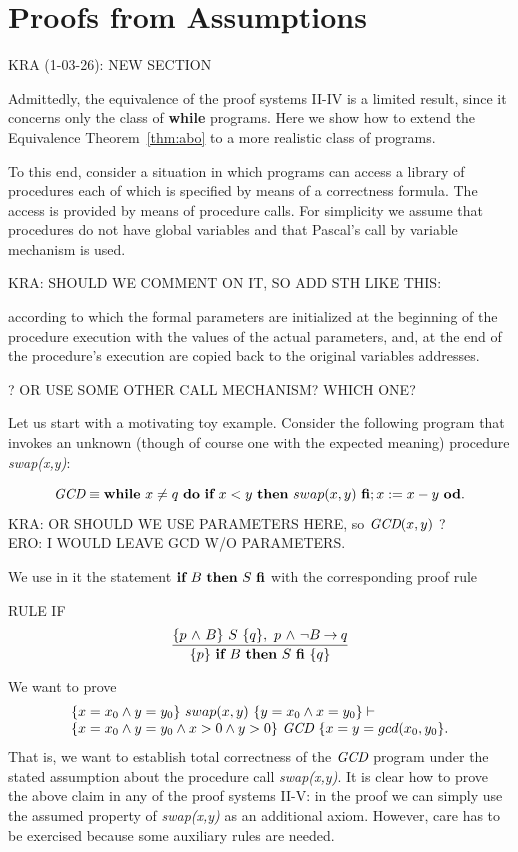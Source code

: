 \documentclass[runningheads]{llncs}       %
\begin{document}
\section{Proofs from Assumptions}

KRA (1-03-26): NEW SECTION
\III

Admittedly, the equivalence of the proof systems II-IV is a limited
result, since it concerns only the class of \textbf{while}
programs. Here we show how to extend the Equivalence
Theorem~\ref{thm:abo} to a more realistic class of programs.

To this end, consider a situation in which programs can access a library of
procedures each of which is specified by means of a correctness
formula. The access is provided by means of procedure calls.  For
simplicity we assume that procedures do not have global variables and
that Pascal's call by variable mechanism is used.

KRA: SHOULD WE COMMENT ON IT, SO ADD STH LIKE THIS: 

\NI
according to which the formal parameters are initialized at the
beginning of the procedure execution with the values of the actual
parameters, and, at the end of the  procedure's execution are
copied back to the original variables addresses.

\NI ? OR USE SOME OTHER CALL MECHANISM? WHICH ONE?

Let us start with a motivating toy example. Consider the following program
that invokes an unknown (though of course one with the expected meaning)
procedure \emph{swap(x,y)}:

\[
\mbox{{\it GCD}} \equiv \mbox{$\mbox{{\bf while}\ } {x \neq q}\ \mbox{{\bf do}\ } {\mbox{$\mbox{{\bf if}\ } {x < y} \mbox{\ {\bf then}\ } {swap(x,y)}\ \mbox{{\bf fi}}$}; x:= x-y}\ \mbox{{\bf od}}$}.
\]
KRA: OR SHOULD WE USE PARAMETERS HERE, so $\mbox{{\it GCD}}(x,y)$ ? \\
ERO: I WOULD LEAVE GCD W/O PARAMETERS.

We use in it the statement $\mbox{$\mbox{{\bf if}\ } {B} \mbox{\ {\bf then}\ } {S}\ \mbox{{\bf fi}}$}$ 
with the corresponding proof rule
\III

\NI
RULE IF
  \[ \frac{ \mbox{$\{{p \mbox{$\ \wedge\ $} B}\}\ {S}\ \{{q}\}$}, \ p \mbox{$\ \wedge\ $} \neg B \mbox{$\:\rightarrow\:$} q}
  { \mbox{$\{{p}\}\ {\mbox{$\mbox{{\bf if}\ } {B} \mbox{\ {\bf then}\ } {S}\ \mbox{{\bf fi}}$}}\ \{{q}\}$}}
  \]
\III
  
We want to prove 
\begin{equation}
 \begin{array}{l}  
\mbox{$\{{x=x_0 \wedge y=y_0}\}\ {swap(x,y)}\ \{{y=x_0 \wedge x=y_0}\}$} \vdash  \\
   \mbox{$\{{x=x_0 \wedge y=y_0 \wedge x>0 \wedge y>0}\}\ {\mbox{{\it GCD}}}\ \{{x=y=gcd(x_0, y_0}\}$}.
 \end{array}
 \label{equ:gcd}
\end{equation}
That is, we want to establish total correctness of the $\mbox{{\it GCD}}$ program
under the stated assumption about the procedure call \emph{swap(x,y)}.
It is clear how to prove the above claim in any of the proof systems
II-V: in the proof we can simply use the assumed property of
\emph{swap(x,y)} as an additional axiom. However, care has to be
exercised because some auxiliary rules are needed.
\end{document}
